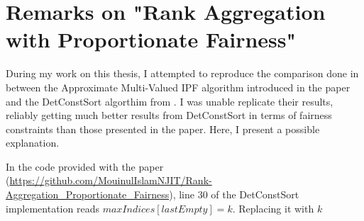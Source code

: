 \chapter{Remarks on "Rank Aggregation with Proportionate Fairness"}
\label{appendix1}

During my work on this thesis, I attempted to reproduce the comparison done in \cite{RAPF} between the Approximate Multi-Valued IPF algorithm introduced in the paper and the DetConstSort algorthim from \cite{linkedin}. I was unable replicate their results, reliably getting much better results from DetConstSort in terms of fairness constraints than those presented in the paper. Here, I present a possible explanation.

In the code provided with the paper (\url{https://github.com/MouinulIslamNJIT/Rank-Aggregation_Proportionate_Fairness}), line 30 of the DetConstSort implementation reads $maxIndices[lastEmpty] = k$. Replacing it with $k$
